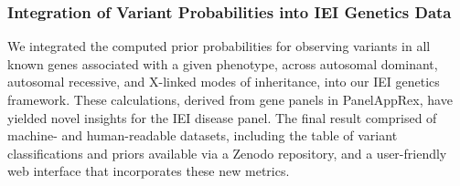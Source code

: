\FloatBarrier
%
%
%
%
%
%
%
%
%

\subsubsection{Integration of Variant Probabilities into IEI Genetics Data}
We integrated the computed prior probabilities for observing variants in all known genes associated with a given phenotype, across autosomal dominant, autosomal recessive, and X-linked modes of inheritance, into our IEI genetics framework. These calculations, derived from gene panels in PanelAppRex, have yielded novel insights for the IEI disease panel. The final result comprised of machine- and human-readable datasets, including the table of variant classifications and priors available via a Zenodo repository, and a user-friendly web interface that incorporates these new metrics.


